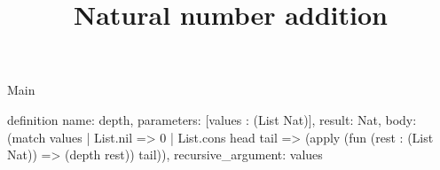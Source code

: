 \begin{lexlean}{Main}
\title{Natural number addition}
\begin{semanticmodule}
definition{
  name: depth,
  parameters: [values : (List Nat)],
  result: Nat,
  body: (match values
    | List.nil => 0
    | List.cons head tail => (apply (fun (rest : (List Nat)) => (depth rest)) tail)),
  recursive_argument: values
}
\end{semanticmodule}
\end{lexlean}
